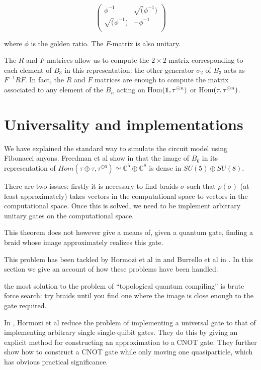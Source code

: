 \begin{equation}
\begin{pmatrix}
\phi^{-1} & \sqrt(\phi^{-1}) \\
\sqrt(\phi^{-1}) & -\phi^{-1} \\
\end{pmatrix}
\end{equation}

where $\phi$ is the golden ratio. The $F$-matrix is also unitary.

The $R$ and $F$-matrices allow us to compute the $2 \times 2$ matrix
corresponding to each element of $B_3$ in this representation: the other
generator $\sigma_2$ of $B_3$ acts as $F^{-1}RF$. In fact, the $R$ and $F$
matrices are enough to compute the matrix associated to any element of the
$B_n$ acting on $\operatorname{Hom}(\mathbf{1}, \tau^{\odot n})$ or $\operatorname{Hom}(\tau, \tau^{\odot n})$.


\section{Universality and implementations}

We have explained the standard way to simulate the circuit model using
Fibonacci anyons. Freedman et al show in \cite{Freedman2000} that the image of
$B_6$ in its representation of $Hom(\tau \oplus \tau, \tau^{\odot 6}) \simeq
\mathbb{C}^5 \oplus \mathbb{C}^8$ is dense in $SU(5) \oplus SU(8)$. 

There are two issues: firstly it is necessary to find braids $\sigma$ such that
$\rho(\sigma)$ (at least approximately) takes vectors in the computational
space to vectors in the computational space. Once this is solved, we need to be
implement arbitrary unitary gates on the computational space.

This theorem does not however give a means of, given a quantum gate, finding a
braid whose image approximately realizes this gate.

This problem has been tackled by Hormozi et al in \cite{Hormozi2007} and Burrello et al in \cite{Burrello2010}.  In this section we give an account of how these problems have been handled.

the most  solution to the problem of ``topological quantum
compiling'' is brute force search: try braids until you find one where the
image is close enough to the gate required.

In \cite{Hormozi2007}, Hormozi et al reduce the problem of implementing a
universal gate to that of implementing arbitrary single single-quibit gates.
They do this by giving an explicit method for constructing an approximation to a CNOT gate. They further show how to construct a CNOT gate while only moving one quasiparticle, which has obvious practical significance.

